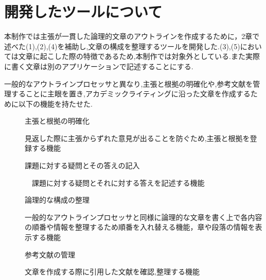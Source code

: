 \documentclass[twocolumn,10pt,a4j]{jsarticle}
\begin{document}
\section{開発したツールについて}
本制作では主張が一貫した論理的文章のアウトラインを作成するために，2章で述べた(1),(2),(4)を補助し,文章の構成を整理するツールを開発した.(3),(5)においては文章に起こした際の特徴であるため,本制作では対象外としている.また実際に書く文章は別のアプリケーションで記述することにする.

一般的なアウトラインプロセッサと異なり,主張と根拠の明確化や,参考文献を管理することに主眼を置き,アカデミックライティングに沿った文章を作成するために以下の機能を持たせた.

\begin{description}
  \item[]主張と根拠の明確化
  
  見返した際に主張からずれた意見が出ることを防ぐため,主張と根拠を登録する機能
  
  \item[]課題に対する疑問とその答えの記入
  
　課題に対する疑問とそれに対する答えを記述する機能
  
  \item[]論理的な構成の整理
  
  一般的なアウトラインプロセッサと同様に論理的な文章を書く上で各内容の順番や情報を整理するため順番を入れ替える機能，章や段落の情報を表示する機能
  
  \item[]参考文献の管理
  
  文章を作成する際に引用した文献を確認,整理する機能 
\end{description}

\begin{comment}
実装した機能として\textcircled{\scriptsize{1}}は「主張と根拠の対応」,\textcircled{\scriptsize{2}}は「課題に対する疑問とその答えの記入」,\textcircled{\scriptsize{3}}は「論理的な構成の整理」,\textcircled{\scriptsize{4}}「参考文献の管理」とする．
\textcircled{\scriptsize{1}}「主張と根拠」ではまず主張の表示をした.
また根拠は複数存在する可能性があるため根拠の追加も行えるようにした.
\textcircled{\scriptsize{2}}「問いと答え」では課題や主張への疑問とそれに対する答えを短い文章で記述し，見返した際に主張からずれた意見が出ることを防ぐことができると考え，課題や主張への疑問と答えを短い文章で記述する．
\textcircled{\scriptsize{3}}「論理的な構成」では論理的な文章を書く上で各内容の順番や序論，本論，結論のどの部分の情報なのかを整理するため順番を入れ替える機能，文章がどの章に情報なのか表示する機能にした．
\textcircled{\scriptsize{4}}「参考文献」では文章を作成する際の引用した文献を整理することが目的であり,どの文献が何章で参照を行ったのか確認できるように参考文献にはラベルを付けた.
\end{comment}
\end{document}
